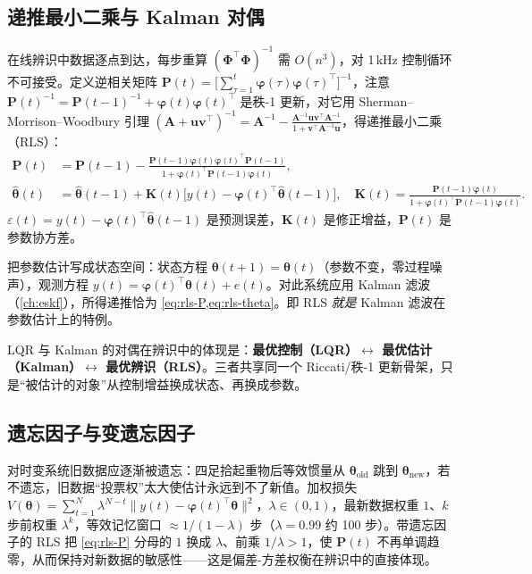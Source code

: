 \subsection{递推最小二乘与 Kalman 对偶}
在线辨识中数据逐点到达，每步重算 $(\boldsymbol\Phi^\top\boldsymbol\Phi)^{-1}$ 需 $O(n^3)$，对 1\,kHz 控制循环不可接受。定义逆相关矩阵 $\mathbf P(t)=\big[\sum_{\tau=1}^t\boldsymbol\varphi(\tau)\boldsymbol\varphi(\tau)^\top\big]^{-1}$，注意 $\mathbf P(t)^{-1}=\mathbf P(t-1)^{-1}+\boldsymbol\varphi(t)\boldsymbol\varphi(t)^\top$ 是秩-1 更新，对它用 Sherman--Morrison--Woodbury 引理 $(\mathbf A+\mathbf u\mathbf v^\top)^{-1}=\mathbf A^{-1}-\frac{\mathbf A^{-1}\mathbf u\mathbf v^\top\mathbf A^{-1}}{1+\mathbf v^\top\mathbf A^{-1}\mathbf u}$，得递推最小二乘（RLS）：
\begin{align}
  \mathbf P(t)&=\mathbf P(t-1)-\frac{\mathbf P(t-1)\boldsymbol\varphi(t)\boldsymbol\varphi(t)^\top\mathbf P(t-1)}{1+\boldsymbol\varphi(t)^\top\mathbf P(t-1)\boldsymbol\varphi(t)},\label{eq:rls-P}\\
  \hat{\boldsymbol\theta}(t)&=\hat{\boldsymbol\theta}(t-1)+\mathbf K(t)\big[y(t)-\boldsymbol\varphi(t)^\top\hat{\boldsymbol\theta}(t-1)\big],\quad
  \mathbf K(t)=\frac{\mathbf P(t-1)\boldsymbol\varphi(t)}{1+\boldsymbol\varphi(t)^\top\mathbf P(t-1)\boldsymbol\varphi(t)}.\label{eq:rls-theta}
\end{align}
$\varepsilon(t)=y(t)-\boldsymbol\varphi(t)^\top\hat{\boldsymbol\theta}(t-1)$ 是预测误差，$\mathbf K(t)$ 是修正增益，$\mathbf P(t)$ 是参数协方差。

\begin{theorem}[RLS = 参数估计的 Kalman 滤波]
\label{thm:rls-kalman}
把参数估计写成状态空间：状态方程 $\boldsymbol\theta(t+1)=\boldsymbol\theta(t)$（参数不变，零过程噪声），观测方程 $y(t)=\boldsymbol\varphi(t)^\top\boldsymbol\theta(t)+e(t)$。对此系统应用 Kalman 滤波（\cref{ch:eskf}），所得递推恰为 \cref{eq:rls-P,eq:rls-theta}。即 RLS \emph{就是} Kalman 滤波在参数估计上的特例。
\end{theorem}

\begin{insight}
LQR 与 Kalman 的对偶在辨识中的体现是：\textbf{最优控制（LQR）$\leftrightarrow$ 最优估计（Kalman）$\leftrightarrow$ 最优辨识（RLS）}。三者共享同一个 Riccati/秩-1 更新骨架，只是“被估计的对象”从控制增益换成状态、再换成参数。
\end{insight}

\subsection{遗忘因子与变遗忘因子}
对时变系统旧数据应逐渐被遗忘：四足拾起重物后等效惯量从 $\boldsymbol\theta_{\text{old}}$ 跳到 $\boldsymbol\theta_{\text{new}}$，若不遗忘，旧数据“投票权”太大使估计永远到不了新值。加权损失 $V(\boldsymbol\theta)=\sum_{t=1}^N\lambda^{N-t}\|y(t)-\boldsymbol\varphi(t)^\top\boldsymbol\theta\|^2$，$\lambda\in(0,1)$，最新数据权重 $1$、$k$ 步前权重 $\lambda^k$，等效记忆窗口 $\approx 1/(1-\lambda)$ 步（$\lambda=0.99$ 约 100 步）。带遗忘因子的 RLS 把 \cref{eq:rls-P} 分母的 $1$ 换成 $\lambda$、前乘 $1/\lambda>1$，使 $\mathbf P(t)$ 不再单调趋零，从而保持对新数据的敏感性——这是偏差-方差权衡在辨识中的直接体现。

